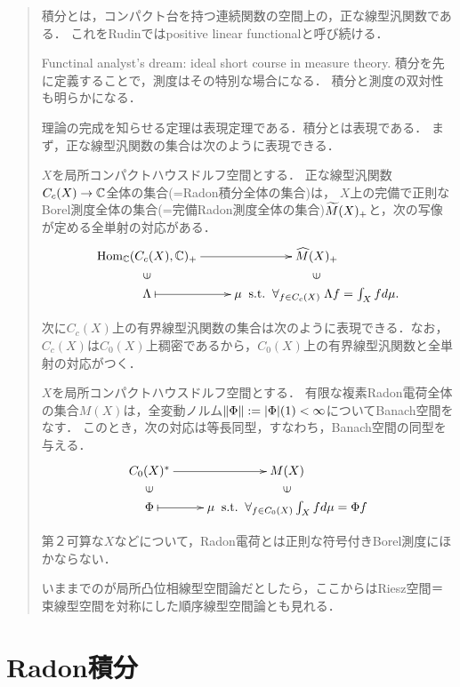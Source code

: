 \documentclass[uplatex,dvipdfmx]{jsreport}
\begin{document}
\begin{quotation}
    積分とは，コンパクト台を持つ連続関数の空間上の，正な線型汎関数である．
    これをRudinではpositive linear functionalと呼び続ける．

    Functinal analyst's dream: ideal short course in measure theory.
    積分を先に定義することで，測度はその特別な場合になる．
    積分と測度の双対性も明らかになる．

    理論の完成を知らせる定理は表現定理である．積分とは表現である．
    まず，正な線型汎関数の集合は次のように表現できる．
    \begin{theorem}
        $X$を局所コンパクトハウスドルフ空間とする．
        正な線型汎関数$C_c(X)\to\mathbb{C}$全体の集合(=Radon積分全体の集合)は，
        $X$上の完備で正則なBorel測度全体の集合(=完備Radon測度全体の集合)$\widetilde{M}(X)_+$と，次の写像が定める全単射の対応がある．
        \[\xymatrix@R-2pc{
            \Hom_\C(C_c(X),\C)_+\ar[r]&\wh{M}(X)_+\\
            \rotatebox[origin=c]{90}{$\in$}&\rotatebox[origin=c]{90}{$\in$}\\
            \Lambda\ar@{|->}[r]&\mu\;\st\;\forall_{f\in C_c(X)}\;\Lambda f=\int_Xfd\mu.
        }\]
    \end{theorem}
    次に$C_c(X)$上の有界線型汎関数の集合は次のように表現できる．なお，$C_c(X)$は$C_0(X)$上稠密であるから，$C_0(X)$上の有界線型汎関数と全単射の対応がつく．
    \begin{theorem}
        $X$を局所コンパクトハウスドルフ空間とする．
        有限な複素Radon電荷全体の集合$M(X)$は，全変動ノルム$\|\Phi\|:=\lvert\Phi\rvert(1)<\infty$についてBanach空間をなす．
        このとき，次の対応は等長同型，すなわち，Banach空間の同型を与える．
        \[\xymatrix@R-2pc{
            C_0(X)^*\ar[r]&M(X)\\
            \rotatebox[origin=c]{90}{$\in$}&\rotatebox[origin=c]{90}{$\in$}\\
            \Phi\ar@{|->}[r]&\mu\;\st\;\forall_{f\in C_0(X)}\int_Xfd\mu=\Phi f
        }\]
    \end{theorem}
    第２可算な$X$などについて，Radon電荷とは正則な符号付きBorel測度にほかならない．

    いままでのが局所凸位相線型空間論だとしたら，ここからはRiesz空間＝束線型空間を対称にした順序線型空間論とも見れる．
\end{quotation}

\section{Radon積分}
\end{document}
